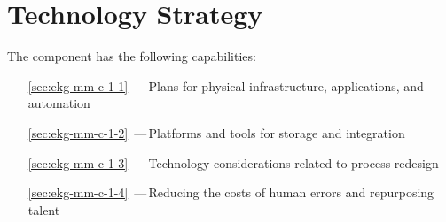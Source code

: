 \chapter{Technology Strategy}\label{ch:ekg-mm-c-1}

The  component has the following capabilities:

\begin{itemize}[leftmargin=.5in]
  \item [\ref{sec:ekg-mm-c-1-1}] \,---\,Plans for physical infrastructure, applications, and automation
  \item [\ref{sec:ekg-mm-c-1-2}] \,---\,Platforms and tools for storage and integration
  \item [\ref{sec:ekg-mm-c-1-3}] \,---\,Technology considerations related to process redesign
  \item [\ref{sec:ekg-mm-c-1-4}] \,---\,Reducing the costs of human errors and repurposing talent
\end{itemize}





